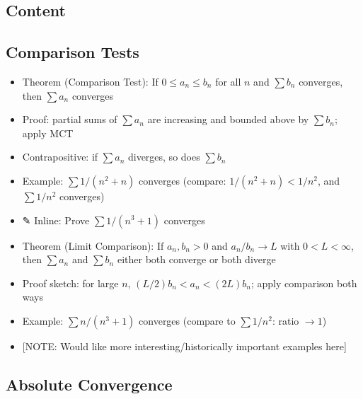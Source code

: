 \documentclass[
  10pt,
  letterpaper,
]{scrbook}
\providecommand{\tightlist}{%
  \setlength{\itemsep}{0pt}\setlength{\parskip}{0pt}}
\begin{document}
\subsection{Content}\label{content-16}

\subsection{Comparison Tests}\label{comparison-tests}

\begin{itemize}
\tightlist
\item
  Theorem (Comparison Test): If \(0 \leq a_n \leq b_n\) for all \(n\)
  and \(\sum b_n\) converges, then \(\sum a_n\) converges
\item
  Proof: partial sums of \(\sum a_n\) are increasing and bounded above
  by \(\sum b_n\); apply MCT
\item
  Contrapositive: if \(\sum a_n\) diverges, so does \(\sum b_n\)
\item
  Example: \(\sum 1/(n^2 + n)\) converges (compare:
  \(1/(n^2+n) < 1/n^2\), and \(\sum 1/n^2\) converges)
\item
  ✎ Inline: Prove \(\sum 1/(n^3 + 1)\) converges
\item
  Theorem (Limit Comparison): If \(a_n, b_n > 0\) and \(a_n/b_n \to L\)
  with \(0 < L < \infty\), then \(\sum a_n\) and \(\sum b_n\) either
  both converge or both diverge
\item
  Proof sketch: for large \(n\), \((L/2) b_n < a_n < (2L) b_n\); apply
  comparison both ways
\item
  Example: \(\sum n/(n^3 + 1)\) converges (compare to \(\sum 1/n^2\):
  ratio \(\to 1\))
\item
  {[}NOTE: Would like more interesting/historically important examples
  here{]}
\end{itemize}

\subsection{Absolute Convergence}\label{absolute-convergence}
\end{document}
